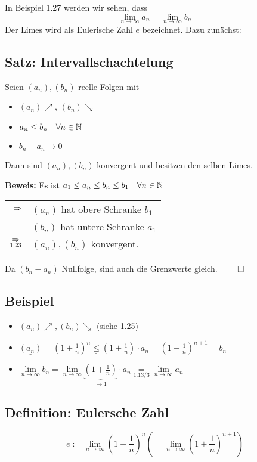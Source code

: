 \documentclass[10pt,a4paper]{article}
\begin{document}
    In Beispiel 1.27 werden wir sehen, dass
    $$\lim_{n \to \infty} a_n = \lim_{n \to \infty} b_n$$
    Der Limes wird als Eulerische Zahl $e$ bezeichnet. Dazu zunächst:

    \subsection{Satz: Intervallschachtelung}
    Seien $(a_n),  (b_n)$ reelle Folgen mit
    \begin{itemize}
        \item $(a_n)\nearrow$, $(b_n)\searrow$
        \item $a_n \leq b_n \quad \forall n \in \mathbb{N}$
        \item $b_n - a_n \to 0$
    \end{itemize}
    Dann sind $(a_n), (b_n)$ konvergent und besitzen den selben Limes.

    \textbf{Beweis: } Es ist $a_1 \leq a_n \leq b_n \leq b_1 \quad \forall n \in \mathbb{N}$
    
    \begin{tabular}{rl}
        $\Rightarrow$ & $(a_n)$ hat obere Schranke $b_1$ \\
        & $(b_n)$ hat untere Schranke $a_1$ \\
        $\underset{1.23}{\Rightarrow}$ & $(a_n), (b_n)$ konvergent.
    \end{tabular}

    Da $(b_n - a_n)$ Nullfolge, sind auch die Grenzwerte gleich. $\qed$

    \subsection{Beispiel}
    \begin{itemize}
        \item $(a_n)\nearrow, (b_n)\searrow$ (siehe 1.25)
        \item $\underline{(a_n)} = \left(1 + \frac{1}{n}\right)^n \underline{\leq} \left(1 + \frac{1}{n}\right) \cdot a_n = \left(1 + \frac{1}{n}\right)^{n+1} = \underline{b_n}$
        \item $\lim\limits_{n \to \infty} b_n = \lim\limits_{n \to \infty} \underbrace{\left(1 + \frac{1}{n}\right)}_{\to 1} \cdot a_n \underset{1.13/3}{=} \lim\limits_{n \to \infty} a_n$
    \end{itemize}

    \subsection{Definition: Eulersche Zahl}
    $$
        e := \lim_{n \to \infty} \left(1 + \frac{1}{n}\right)^n \left(= \lim_{n \to \infty} \left(1 + \frac{1}{n}\right)^{n+1} \right)
    $$
\end{document}
